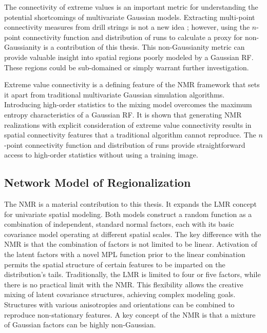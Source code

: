 The connectivity of extreme values is an important metric for understanding the potential shortcomings of multivariate Gaussian models. Extracting multi-point connectivity measures from drill strings is not a new idea \citep{ortiz2003characterization,boisvert2007multiplepoint}; however, using the $n$-point connectivity function and distribution of runs to calculate a proxy for non-Gaussianity is a contribution of this thesis. This non-Gaussianity metric can provide valuable insight into spatial regions poorly modeled by a Gaussian \gls{RF}. These regions could be sub-domained or simply warrant further investigation.

Extreme value connectivity is a defining feature of the \gls{NMR} framework that sets it apart from traditional multivariate Gaussian simulation algorithms. Introducing high-order statistics to the mixing model overcomes the maximum entropy characteristics of a Gaussian \gls{RF}. It is shown that generating \gls{NMR} realizations with explicit consideration of extreme value connectivity results in spatial connectivity features that a traditional algorithm cannot reproduce. The $n$-point connectivity function and distribution of runs provide straightforward access to high-order statistics without using a training image.

\subsection{Network Model of Regionalization}
\label{subsec:07nmr}

The \gls{NMR} is a material contribution to this thesis. It expands the \gls{LMR} concept for univariate spatial modeling. Both models construct a random function as a combination of independent, standard normal factors, each with its basic covariance model operating at different spatial scales. The key difference with the \gls{NMR} is that the combination of factors is not limited to be linear. Activation of the latent factors with a novel \gls{MPL} function prior to the linear combination permits the spatial structure of certain features to be imparted on the distribution's tails. Traditionally, the \gls{LMR} is limited to four or five factors, while there is no practical limit with the \gls{NMR}. This flexibility allows the creative mixing of latent covariance structures, achieving complex modeling goals. Structures with various anisotropies and orientations can be combined to reproduce non-stationary features. A key concept of the \gls{NMR} is that a mixture of Gaussian factors can be highly non-Gaussian.

